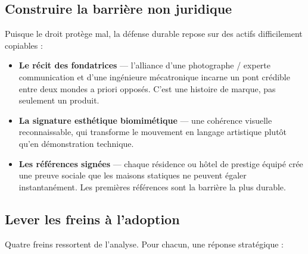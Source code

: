 \documentclass[11pt,a4paper]{article}
\begin{document}
\subsection{Construire la barrière non juridique}

Puisque le droit protège mal, la défense durable repose sur des actifs difficilement copiables :

\begin{itemize}
  \item \textbf{Le récit des fondatrices} — l'alliance d'une photographe / experte communication et d'une ingénieure mécatronique incarne un pont crédible entre deux mondes a priori opposés. C'est une histoire de marque, pas seulement un produit.
  \item \textbf{La signature esthétique biomimétique} — une cohérence visuelle reconnaissable, qui transforme le mouvement en langage artistique plutôt qu'en démonstration technique.
  \item \textbf{Les références signées} — chaque résidence ou hôtel de prestige équipé crée une preuve sociale que les maisons statiques ne peuvent égaler instantanément. Les premières références sont la barrière la plus durable.
\end{itemize}

\subsection{Lever les freins à l'adoption}

Quatre freins ressortent de l'analyse. Pour chacun, une réponse stratégique :
\end{document}
